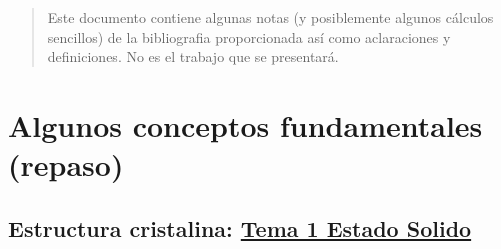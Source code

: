 \documentclass[11pt]{article}
\date{\today}
\title{}
\begin{document}
\tableofcontents

\begin{abstract}
Este documento contiene algunas notas (y posiblemente algunos cálculos sencillos) de la bibliografia proporcionada así como aclaraciones y definiciones. No es el trabajo que se presentará.
\end{abstract}
\section{Algunos conceptos fundamentales (repaso)}
\label{sec:org2631e9b}
\subsection{Estructura cristalina: \href{Tema1\_Estado\_Solido.pdf}{Tema 1 Estado Solido}}
\label{sec:org88c8526}
\end{document}
